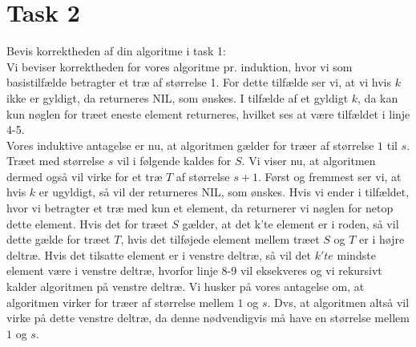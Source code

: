 \section{Task 2}

Bevis korrektheden af din algoritme i task 1:\\

Vi beviser korrektheden for vores algoritme pr. induktion, hvor vi som basistilfælde betragter et træ af størrelse 1. For dette tilfælde ser vi, at vi hvis $k$ ikke er gyldigt, da returneres NIL, som ønskes. I tilfælde af et gyldigt $k$, da kan kun nøglen for træet eneste element returneres, hvilket ses at være tilfældet i linje 4-5.\\
Vores induktive antagelse er nu, at algoritmen gælder for træer af størrelse $1$ til $s$. Træet med størrelse $s$ vil i følgende kaldes for $S$.
Vi viser nu, at algoritmen dermed også vil virke for et træ $T$ af størrelse $s+1$.
Først og fremmest ser vi, at hvis $k$ er ugyldigt, så vil der returneres NIL, som ønskes.
Hvis vi ender i tilfældet, hvor vi betragter et træ med kun et element, da returnerer vi nøglen for netop dette element.
Hvis det for træet $S$ gælder, at det k'te element er i roden, så vil dette gælde for træet $T$, hvis det tilføjede element mellem træet $S$ og $T$ er i højre deltræ. Hvis det tilsatte element er i venstre deltræ, så vil det $k'te$ mindste element være i venstre deltræ, hvorfor linje 8-9 vil eksekveres og vi rekursivt kalder algoritmen på venstre deltræ. Vi husker på vores antagelse om, at algoritmen virker for træer af størrelse mellem $1$ og $s$. Dvs, at algoritmen altså vil virke på dette venstre deltræ, da denne nødvendigvis må have en størrelse mellem $1$ og $s$. 

